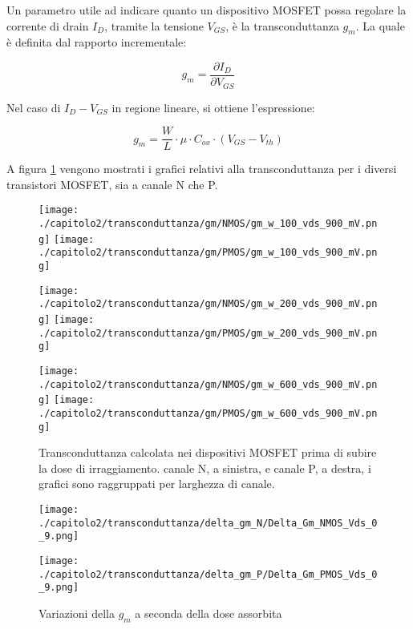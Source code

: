 Un parametro utile ad indicare quanto un dispositivo MOSFET possa regolare la corrente di drain $I_D$, tramite la tensione $V_{GS}$, è la transconduttanza $g_m$. La quale è definita dal rapporto incrementale:

$$g_m = \frac{\partial I_D}{\partial V_{GS}}$$

Nel caso di $I_D-V_{GS}$ in regione lineare, si ottiene l'espressione:

$$g_m = \frac{W}{L} \cdot \mu \cdot C_{ox} \cdot (V_{GS} - V_{th})$$



A figura \ref{fig:gm_w} vengono mostrati i grafici relativi alla transconduttanza per i diversi transistori MOSFET, sia a canale N che P.  

\begin{figure}[ht]
    \centering
    \texttt{[image: ./capitolo2/transconduttanza/gm/NMOS/gm\_w\_100\_vds\_900\_mV.png]}
    \texttt{[image: ./capitolo2/transconduttanza/gm/PMOS/gm\_w\_100\_vds\_900\_mV.png]}

    \vspace{0.5cm}
    \texttt{[image: ./capitolo2/transconduttanza/gm/NMOS/gm\_w\_200\_vds\_900\_mV.png]}
    \texttt{[image: ./capitolo2/transconduttanza/gm/PMOS/gm\_w\_200\_vds\_900\_mV.png]}
    \vspace{0.5cm}

    \texttt{[image: ./capitolo2/transconduttanza/gm/NMOS/gm\_w\_600\_vds\_900\_mV.png]}
    \texttt{[image: ./capitolo2/transconduttanza/gm/PMOS/gm\_w\_600\_vds\_900\_mV.png]}

    \caption{Transconduttanza calcolata nei dispositivi MOSFET prima di subire la dose di irraggiamento. canale N, a sinistra, e canale P, a destra, i grafici sono raggruppati per larghezza di canale.}
    \label{fig:gm_w}

\end{figure}



\begin{figure}[ht]
    
    \centering

    \texttt{[image: ./capitolo2/transconduttanza/delta\_gm\_N/Delta\_Gm\_NMOS\_Vds\_0\_9.png]}

    \vspace{0.1\textheight}

    \texttt{[image: ./capitolo2/transconduttanza/delta\_gm\_P/Delta\_Gm\_PMOS\_Vds\_0\_9.png]}

    \caption{Variazioni della $g_m$ a seconda della dose assorbita}
    \label{fig:delta_gm}


\end{figure}

